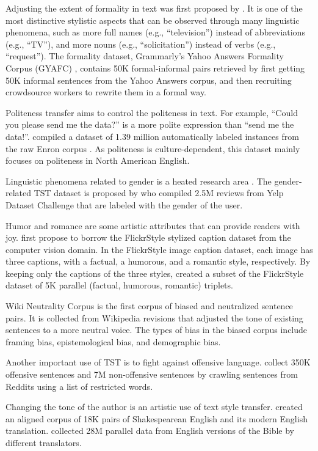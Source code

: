 Adjusting the extent of formality in text was first proposed by . It is one of the most distinctive stylistic aspects that can be observed through many linguistic phenomena, such as more full names (e.g., ``television'') instead of abbreviations (e.g., ``TV''), and more nouns (e.g., ``solicitation'') instead of verbs (e.g., ``request''). 
The formality dataset, Grammarly’s Yahoo Answers Formality Corpus (GYAFC) ,
contains 50K formal-informal pairs retrieved by first getting 50K informal sentences from the Yahoo Answers corpus, and then recruiting crowdsource workers to rewrite them in a formal way. 

Politeness transfer  aims to control the politeness in text. For example, ``Could you please send me the
data?'' is a more polite expression than ``send
me the data!''.  compiled a dataset of 1.39 million automatically labeled instances from the raw Enron corpus . As politeness is culture-dependent, this dataset mainly focuses on politeness in North American English.

Linguistic phenomena related to gender is a heated research area
. The gender-related TST dataset is proposed by  who compiled 2.5M reviews from Yelp Dataset Challenge that are labeled with the gender of the user.

Humor and romance are some artistic attributes that can provide readers with joy.  first propose to borrow the FlickrStyle stylized caption dataset  from the computer vision domain. In the FlickrStyle image caption dataset, each image has three captions, with a factual, a humorous, and a romantic style, respectively. By keeping only the captions of the three styles,  created a subset of the FlickrStyle dataset of 5K parallel (factual, humorous, romantic) triplets.

Wiki Neutrality Corpus  is the first corpus of biased and neutralized sentence pairs. It is collected from Wikipedia revisions that adjusted the tone of existing sentences to a more neutral voice. The types of bias in the biased corpus include framing bias, epistemological bias, and demographic bias.

Another important use of TST is to fight against offensive language. 
 collect 350K offensive sentences and 7M non-offensive sentences by crawling sentences from Reddits using a list of restricted words.

Changing the tone of the author is an artistic use of text style transfer.  created an aligned corpus of 18K pairs of Shakespearean English and its modern English translation.  collected 28M parallel data from English versions of the Bible by different translators.

